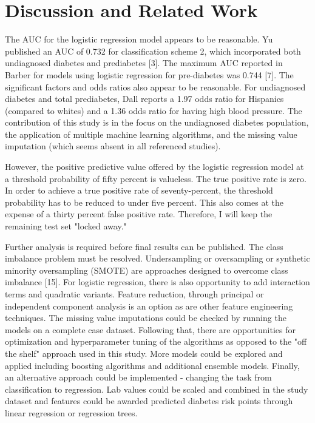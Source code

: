 \documentclass[twoside,11pt]{article}
\begin{document}
\section{Discussion and Related Work} 

The AUC for the logistic regression model appears to be reasonable. Yu published an AUC of 0.732 for classification scheme 2, which incorporated both undiagnosed diabetes and prediabetes [3]. The maximum AUC reported in Barber for models using logistic regression for pre-diabetes was 0.744 [7]. The significant factors and odds ratios also appear to be reasonable. For undiagnosed diabetes and total prediabetes, Dall reports a 1.97 odds ratio for Hispanics (compared to whites) and a 1.36 odds ratio for having high blood pressure. The contribution of this study is in the focus on the undiagnosed diabetes population, the application of multiple machine learning algorithms, and the missing value imputation (which seems absent in all referenced studies). 

However, the positive predictive value offered by the logistic regression model at a threshold probability of fifty percent is valueless. The true positive rate is zero. In order to achieve a true positive rate of seventy-percent, the threshold probability has to be reduced to under five percent. This also comes at the expense of a thirty percent false positive rate. Therefore, I will keep the remaining test set "locked away." 

Further analysis is required before final results can be published. The class imbalance problem must be resolved. Undersampling or oversampling or synthetic minority oversampling (SMOTE) are approaches designed to overcome class imbalance [15]. For logistic regression, there is also opportunity to add interaction terms and quadratic variants. Feature reduction, through principal or independent component analysis is an option as are other feature engineering techniques. The missing value imputations could be checked by running the models on a complete case dataset. Following that, there are opportunities for optimization and hyperparameter tuning of the algorithms as opposed to the "off the shelf" approach used in this study. More models could be explored and applied including boosting algorithms and additional ensemble models. Finally, an alternative approach could be implemented - changing the task from classification to regression. Lab values could be scaled and combined in the study dataset and features could be awarded predicted diabetes risk points through linear regression or regression trees. 
\end{document}
